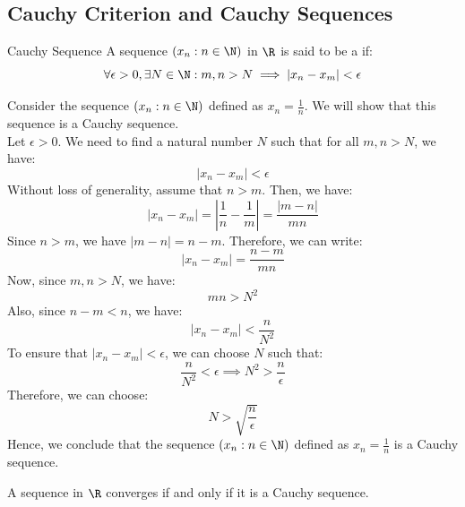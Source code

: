 \documentclass[openany]{book}
\begin{document}
\subsection{Cauchy Criterion and Cauchy Sequences}
\begin{mydefinition}{Cauchy Sequence}
    A sequence $(x_n : n \in \N)$ in $\R$ is said to be a  if:
    $$\forall \epsilon > 0, \exists N \in \N: m,n > N \implies |x_n - x_m| < \epsilon$$
\end{mydefinition}
\begin{example}
    Consider the sequence $(x_n : n \in \N)$ defined as $x_n = \frac{1}{n}$. We will show that this sequence is a Cauchy sequence. \\
    Let $\epsilon > 0$. We need to find a natural number $N$ such that for all $m,n > N$, we have:
    $$|x_n - x_m| < \epsilon$$
    Without loss of generality, assume that $n > m$. Then, we have:
    $$|x_n - x_m| = \left|\frac{1}{n} - \frac{1}{m}\right| = \frac{|m - n|}{mn}$$
    Since $n > m$, we have $|m - n| = n - m$. Therefore, we can write:
    $$|x_n - x_m| = \frac{n - m}{mn}$$
    Now, since $m,n > N$, we have:
    $$mn > N^2$$
    Also, since $n - m < n$, we have:
    $$|x_n - x_m| < \frac{n}{N^2}$$
    To ensure that $|x_n - x_m| < \epsilon$, we can choose $N$ such that:
    $$\frac{n}{N^2} < \epsilon \implies N^2 > \frac{n}{\epsilon}$$
    Therefore, we can choose:
    $$N > \sqrt{\frac{n}{\epsilon}}$$
    Hence, we conclude that the sequence $(x_n : n \in \N)$ defined as $x_n = \frac{1}{n}$ is a Cauchy sequence.
\end{example}
\begin{mytheorem}
    A sequence in $\R$ converges if and only if it is a Cauchy sequence.
\end{mytheorem}
\end{document}
